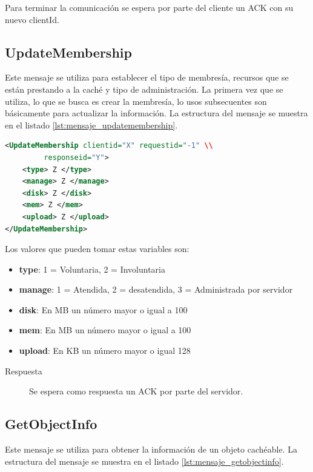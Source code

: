 Para terminar la comunicación se espera por parte del cliente un ACK con su nuevo clientId.

\subsection{UpdateMembership}

Este mensaje se utiliza para establecer el tipo de membresía, recursos que se están prestando a la caché y tipo de administración. La primera vez que se utiliza, lo que se busca es crear la membresía, lo usos subsecuentes son básicamente para actualizar la información. La estructura del mensaje se muestra en el listado \ref{lst:mensaje_updatemembership}.

\begin{lstlisting}[language=XML,caption={Mensaje de UpdateMembership},label={lst:mensaje_updatemembership}]
<UpdateMembership clientid="X" requestid="-1" \\
		 responseid="Y"> 
	<type> Z </type>
	<manage> Z </manage>
	<disk> Z </disk>
	<mem> Z </mem>
	<upload> Z </upload>
</UpdateMembership>
\end{lstlisting}

Los valores que pueden tomar estas variables son:

\begin{itemize}
\item \textbf{type}: 1 = Voluntaria, 2 = Involuntaria
\item \textbf{manage}: 1 = Atendida, 2 = desatendida, 3 = Administrada por servidor
\item \textbf{disk}: En MB un número mayor o igual a 100
\item \textbf{mem}: En MB un número mayor o igual a 100
\item \textbf{upload}: En KB un número mayor o igual 128
\end{itemize}

\begin{description}
\item[Respuesta] Se espera como respuesta un ACK por parte del servidor.
\end{description}

\subsection{GetObjectInfo}
Este mensaje se utiliza para obtener la información de un objeto cachéable. La estructura del mensaje se muestra en el listado \ref{lst:mensaje_getobjectinfo}.

